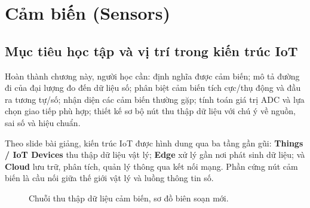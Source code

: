 \chapter{Cảm biến (Sensors)}
\label{chap:sensors}

\section{Mục tiêu học tập và vị trí trong kiến trúc IoT}
Hoàn thành chương này, người học cần: định nghĩa được cảm biến; mô tả đường đi của đại lượng đo đến dữ liệu số; phân biệt cảm biến tích cực/thụ động và đầu ra tương tự/số; nhận diện các cảm biến thường gặp; tính toán giá trị ADC và lựa chọn giao tiếp phù hợp; thiết kế sơ bộ nút thu thập dữ liệu với chú ý về nguồn, sai số và hiệu chuẩn.

Theo slide bài giảng, kiến trúc IoT được hình dung qua ba tầng gần gũi: \textbf{Things / IoT Devices} thu thập dữ liệu vật lý; \textbf{Edge} xử lý gần nơi phát sinh dữ liệu; và \textbf{Cloud} lưu trữ, phân tích, quản lý thông qua kết nối mạng. Phần cứng nút cảm biến là cầu nối giữa thế giới vật lý và luồng thông tin số.

\begin{figure}[htbp]\centering
{}
\caption{Chuỗi thu thập dữ liệu cảm biến, sơ đồ biên soạn mới.}
\end{figure}

